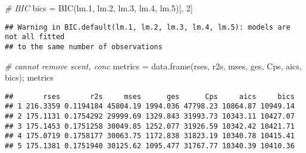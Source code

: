 \documentclass[
]{article}
\newenvironment{Shaded}{\begin{snugshade}}{\end{snugshade}}
\newcommand{\CommentTok}[1]{\textcolor[rgb]{0.56,0.35,0.01}{\textit{#1}}}
\newcommand{\DecValTok}[1]{\textcolor[rgb]{0.00,0.00,0.81}{#1}}
\newcommand{\FloatTok}[1]{\textcolor[rgb]{0.00,0.00,0.81}{#1}}
\newcommand{\FunctionTok}[1]{\textcolor[rgb]{0.00,0.00,0.00}{#1}}
\newcommand{\NormalTok}[1]{#1}
\newcommand{\OtherTok}[1]{\textcolor[rgb]{0.56,0.35,0.01}{#1}}
\begin{document}
\begin{Shaded}
\begin{Highlighting}[]
\CommentTok{\# BIC}
\NormalTok{bics }\OtherTok{=} \FunctionTok{BIC}\NormalTok{(lm}\FloatTok{.1}\NormalTok{, lm}\FloatTok{.2}\NormalTok{, lm}\FloatTok{.3}\NormalTok{, lm}\FloatTok{.4}\NormalTok{, lm}\FloatTok{.5}\NormalTok{)[, }\DecValTok{2}\NormalTok{]}
\end{Highlighting}
\end{Shaded}

\begin{verbatim}
## Warning in BIC.default(lm.1, lm.2, lm.3, lm.4, lm.5): models are not all fitted
## to the same number of observations
\end{verbatim}

\begin{Shaded}
\begin{Highlighting}[]
\CommentTok{\# cannot remove scent, conc}
\NormalTok{metrics }\OtherTok{=} \FunctionTok{data.frame}\NormalTok{(rses, r2s, mses, ges, Cps, aics, bics); metrics}
\end{Highlighting}
\end{Shaded}

\begin{verbatim}
##       rses       r2s     mses      ges      Cps     aics     bics
## 1 216.3359 0.1194184 45804.19 1994.036 47798.23 10864.87 10949.14
## 2 175.1131 0.1754292 29999.69 1329.843 31993.73 10343.11 10427.07
## 3 175.1453 0.1751258 30049.85 1252.077 31926.59 10342.42 10421.71
## 4 175.0719 0.1758177 30063.75 1172.838 31823.19 10340.78 10415.41
## 5 175.1381 0.1751940 30125.62 1095.477 31767.77 10340.39 10410.36
\end{verbatim}
\end{document}
